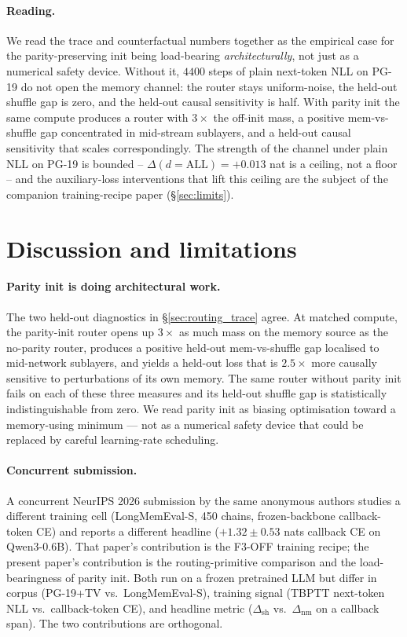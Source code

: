 \documentclass{article}
\newcommand{\dnm}{\Delta_{\text{nm}}}
\newcommand{\dsh}{\Delta_{\text{sh}}}
\begin{document}
\paragraph{Reading.}
We read the trace and counterfactual numbers together as the
empirical case for the parity-preserving init being load-bearing
\emph{architecturally}, not just as a numerical safety device.
Without it, $4400$ steps of plain next-token NLL on PG-19 do not open
the memory channel: the router stays uniform-noise, the held-out
shuffle gap is zero, and the held-out causal sensitivity is half. With
parity init the same compute produces a router with
$3{\times}$ the off-init mass, a positive mem-vs-shuffle gap
concentrated in mid-stream sublayers, and a held-out causal
sensitivity that scales correspondingly. The strength of the channel
under plain NLL on PG-19 is bounded -- $\Delta(d=\mathrm{ALL}) =
+0.013$ nat is a ceiling, not a floor -- and the auxiliary-loss
interventions that lift this ceiling are the subject of the companion
training-recipe paper (\S\ref{sec:limits}).

\section{Discussion and limitations}
\label{sec:discussion}

\paragraph{Parity init is doing architectural work.}
The two held-out diagnostics in \S\ref{sec:routing_trace} agree.
At matched compute, the parity-init router opens up $3\times$ as much
mass on the memory source as the no-parity router, produces a
positive held-out mem-vs-shuffle gap localised to mid-network
sublayers, and yields a held-out loss that is $2.5\times$ more
causally sensitive to perturbations of its own memory.  The same
router without parity init fails on each of these three measures and
its held-out shuffle gap is statistically indistinguishable from
zero.  We read parity init as biasing optimisation toward a
memory-using minimum --- not as a numerical safety device that could
be replaced by careful learning-rate scheduling.

\paragraph{Concurrent submission.}
A concurrent NeurIPS 2026 submission by the same anonymous authors
studies a different training cell (LongMemEval-S, 450 chains,
frozen-backbone callback-token CE) and reports a different headline
($+1.32 \pm 0.53$ nats callback CE on Qwen3-0.6B).  That paper's
contribution is the F3-OFF training recipe; the present paper's
contribution is the routing-primitive comparison and the
load-bearingness of parity init.  Both run on a frozen pretrained
LLM but differ in corpus (PG-19+TV vs.\ LongMemEval-S), training
signal (TBPTT next-token NLL vs.\ callback-token CE), and headline
metric ($\dsh$ vs.\ $\dnm$ on a callback span).  The two
contributions are orthogonal.
\end{document}
